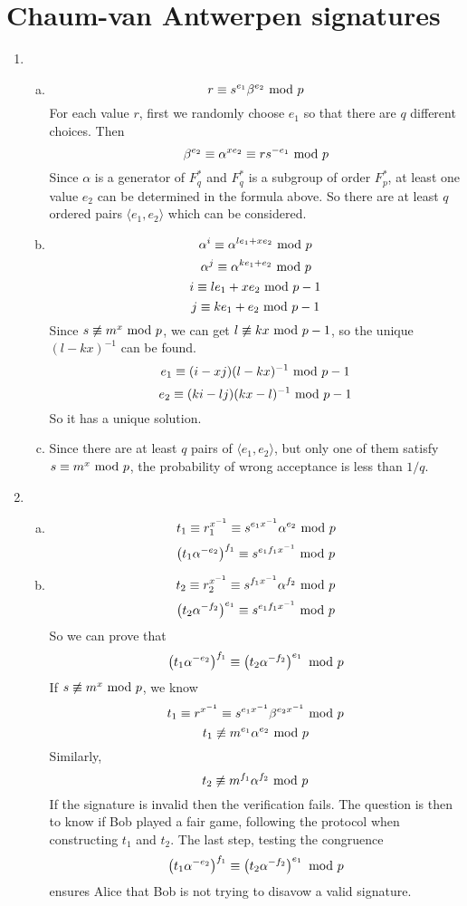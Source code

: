 \documentclass{article}
\renewcommand{\mod}{{\rm\ mod\ }}
\begin{document}
\section{Chaum-van Antwerpen signatures}
\begin{enumerate}
\item
\begin{enumerate}[(a)]
\item
$$r \equiv s^{e_1}\beta^{e_2} \mod p$$
For each value $r$, first we randomly choose $e_1$ so that there are $q$ different choices. Then
$$\beta^{e_2} \equiv \alpha^{xe_2} \equiv rs^{-e_1} \mod p$$
Since $\alpha$ is a generator of $F_q^*$ and $F_q^*$ is a subgroup of order $F_p^*$, at least one value $e_2$ can be determined in the formula above. So there are at least $q$ ordered pairs $\langle e_1,e_2 \rangle$ which can be considered.
\item
$$\alpha^i \equiv \alpha^{le_1+xe_2} \mod p$$
$$\alpha^j \equiv \alpha^{ke_1+e_2} \mod p$$
$$i \equiv le_1+xe_2 \mod p-1$$
$$j \equiv ke_1+e_2 \mod p-1$$
Since $s\not\equiv m^x \mod p$, we can get $l\not\equiv kx \mod p-1$, so the unique $(l-kx)^{-1}$ can be found.
$$e_1 \equiv (i-xj)(l-kx)^{-1} \mod p-1$$
$$e_2 \equiv (ki-lj)(kx-l)^{-1} \mod p-1$$
So it has a unique solution.
\item
Since there are at least $q$ pairs of $\langle e_1,e_2 \rangle$, but only one of them satisfy $s\equiv m^x\mod p$, the probability of wrong acceptance is less than $1/q$.
\end{enumerate}

\item
\begin{enumerate}[(a)]
\item
$$t_1 \equiv r_1^{x^{-1}} \equiv s^{e_1x^{-1}}\alpha^{e_2} \mod p$$
$$\left(t_1\alpha^{-e_2}\right)^{f_1} \equiv s^{e_1f_1x^{-1}} \mod p$$
\item
$$t_2 \equiv r_2^{x^{-1}} \equiv s^{f_1x^{-1}}\alpha^{f_2} \mod p$$
$$\left(t_2\alpha^{-f_2}\right)^{e_1} \equiv s^{e_1f_1x^{-1}} \mod p$$
So we can prove that $$\left(t_1\alpha^{-e_2}\right)^{f_1} \equiv \left(t_2\alpha^{-f_2}\right)^{e_1} \mod p$$
If $s\not\equiv m^x \mod p$, we know
$$t_1\equiv r^{x^{-1}} \equiv s^{e_1x^{-1}}\beta^{e_2x^{-1}} \mod p$$
$$t_1\not\equiv m^{e_1}\alpha^{e_2} \mod p$$
Similarly,
$$t_2\not\equiv m^{f_1}\alpha^{f_2} \mod p$$
If the signature is invalid then the verification fails. The question is then to know if Bob played a fair game, following the protocol when constructing $t_1$ and $t_2$.
The last step, testing the congruence
$$\left(t_1\alpha^{-e_2}\right)^{f_1} \equiv \left(t_2\alpha^{-f_2}\right)^{e_1} \mod p$$
ensures Alice that Bob is not trying to disavow a valid signature.
\end{enumerate}


\end{enumerate}
\end{document}
